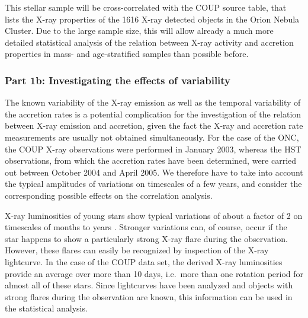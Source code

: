 \documentclass[10pt,fleqn,twoside]{article}
\begin{document}
This stellar sample will be cross-correlated with the
COUP source table, that lists the X-ray properties of the 1616 X-ray detected objects
in the Orion Nebula Cluster. Due to the large sample size,
this will allow already a much more detailed statistical analysis of the relation between
X-ray activity and accretion properties in mass- and age-stratified samples
than possible before.



\subsubsection*{Part 1b: Investigating the effects of variability}

The known variability of the X-ray emission as well as the 
temporal variability of the accretion rates is a potential 
complication  for the investigation of the relation between
X-ray emission and accretion, given the fact the X-ray and
accretion rate measurements are usually not obtained simultaneously.
For the case of the ONC, the COUP X-ray observations were performed 
in January 2003, whereas the HST observations, from which the accretion rates
have been determined, were carried out 
between October 2004 and April 2005.
%
We therefore have to take into account the typical amplitudes
of variations on timescales of a few years, and consider
the corresponding possible effects on the correlation analysis.



\smallskip


X-ray luminosities of young stars show typical variations of about
a factor of 2 on timescales of months to years \citep[e.g.][]{Wolk04}.
Stronger variations can, of course,  occur if the star happens to show a
particularly strong X-ray flare during the observation. However,
these flares can easily be recognized by inspection of
the X-ray lightcurve.
%
In the case of the COUP data set, the derived X-ray luminosities
provide an average over more than 10 days, i.e.~more than one
rotation period for almost all of these stars.
Since lightcurves have been analyzed and objects with strong
flares during the observation are known, this information can
be used in the statistical analysis.

\medskip
\end{document}
